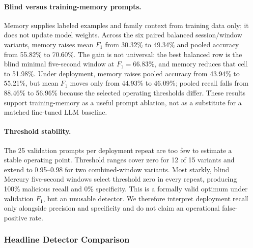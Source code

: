\documentclass[letterpaper,twocolumn,10pt]{article}
\begin{document}
\paragraph{Blind versus training-memory prompts.}
Memory supplies labeled examples and family context from training data only; it does not update model weights. Across the six paired balanced session/window variants, memory raises mean $F_1$ from 30.32\% to 49.34\% and pooled accuracy from 55.82\% to 70.60\%. The gain is not universal: the best balanced row is the blind minimal five-second window at $F_1=66.83\%$, and memory reduces that cell to 51.98\%. Under deployment, memory raises pooled accuracy from 43.94\% to 55.21\%, but mean $F_1$ moves only from 44.93\% to 46.09\%; pooled recall falls from 88.46\% to 56.96\% because the selected operating thresholds differ. These results support training-memory as a useful prompt ablation, not as a substitute for a matched fine-tuned LLM baseline.

\paragraph{Threshold stability.}
The 25 validation prompts per deployment repeat are too few to estimate a stable operating point. Threshold ranges cover zero for 12 of 15 variants and extend to 0.95--0.98 for two combined-window variants. Most starkly, blind Mercury five-second windows select threshold zero in every repeat, producing 100\% malicious recall and 0\% specificity. This is a formally valid optimum under validation $F_1$, but an unusable detector. We therefore interpret deployment recall only alongside precision and specificity and do not claim an operational false-positive rate.

\subsubsection{Headline Detector Comparison}
\end{document}
